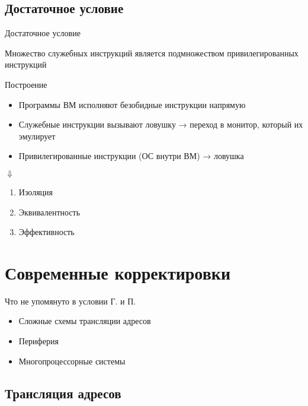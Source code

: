 \subsection{Достаточное условие}

\begin{frame}{Достаточное условие}

Множество служебных инструкций является подмножеством привилегированных инструкций

\centering
{} 
\end{frame}

\begin{frame}{Построение}
\begin{itemize}
    \item Программы ВМ исполняют безобидные инструкции напрямую
    \item Служебные инструкции вызывают ловушку → переход в монитор, который их эмулирует
    \item Привилегированные инструкции (ОС внутри ВМ) → ловушка
\end{itemize}

\centering$\Downarrow$

\begin{enumerate}
    \item Изоляция
    \item Эквивалентность
    \item Эффективность
\end{enumerate}
\end{frame}

\section{Современные корректировки}

\begin{frame}{Что не упомянуто в условии Г. и П.}

\begin{itemize}
    \item Сложные схемы трансляции адресов
    \item Периферия
    \item Многопроцессорные системы
\end{itemize}
\end{frame}

\subsection{Трансляция адресов}

